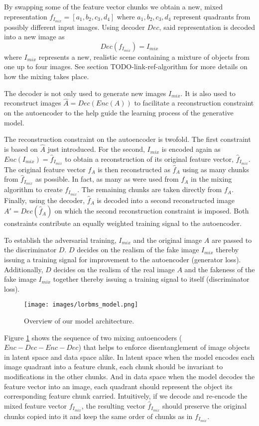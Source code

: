 \documentclass[12pt,a4paper]{article}
\begin{document}
By swapping some of the feature vector chunks we obtain a new, mixed representation $f_{I_{mix}} = [a_1, b_2, c_3, d_4]$ where $a_1,b_2,c_3,d_4$ represent quadrants from possibly different input images. Using decoder $Dec$, said representation is decoded into a new image as
\begin{equation} \label{eq:3}
    Dec(f_{I_{mix}}) = I_{mix}
\end{equation}
where $I_{mix}$ represents a new, realistic scene containing a mixture of objects from one up to four images. See section TODO-link-ref-algorithm for more details on how the mixing takes place.

The decoder is not only used to generate new images $I_{mix}$. It is also used to reconstruct images $\hat{A} = Dec(Enc(A))$ to facilitate a reconstruction constraint on the autoencoder to the help guide the learning process of the generative model.

The reconstruction constraint on the autoencoder is twofold. The first constraint is based on $\hat{A}$ just introduced. For the second, $I_{mix}$ is encoded again as $Enc(I_{mix}) = \hat{f}_{I_{mix}}$ to obtain a reconstruction of its original feature vector, $\hat{f}_{I_{mix}}$. The original feature vector $f_A$ is then reconstructed as $\hat{f}_A$ using as many chunks from $\hat{f}_{I_{mix}}$ as possible. In fact, as many as were used from $f_A$ in the mixing algorithm to create $f_{I_{mix}}$. The remaining chunks are taken directly from $f_A$. Finally, using the decoder, $\hat{f}_A$ is decoded into a second reconstructed image $A' = Dec(\hat{f}_A)$ on which the second reconstruction constraint is imposed. Both constraints contribute an equally weighted training signal to the autoencoder.

To establish the adversarial training, $I_{mix}$ and the original image $A$ are passed to the discriminator $D$. $D$ decides on the realism of the fake image $I_{mix}$ thereby issuing a training signal for improvement to the autoencoder (generator loss). Additionally, $D$ decides on the realism of the real image $A$ and the fakeness of the fake image $I_{mix}$ together thereby issuing a training signal to itself (discriminator loss).

\begin{figure}[h]
\centering
\texttt{[image: images/lorbms\_model.png]}
\caption{Overview of our model architecture.}
\label{fig:model_arch}
\end{figure}

Figure \ref{fig:model_arch} shows the sequence of two mixing autoencoders ($Enc-Dec-Enc-Dec$) that helps to enforce disentanglement of image objects in latent space and data space alike. In latent space when the model encodes each image quadrant into a feature chunk, each chunk should be invariant to modifications in the other chunks. And in data space when the model decodes the feature vector into an image, each quadrant should represent the object its corresponding feature chunk carried. Intuitively, if we decode and re-encode the mixed feature vector $f_{I_{mix}}$, the resulting vector $\hat{f}_{I_{mix}}$ should preserve the original chunks copied into it and keep the same order of chunks as in $f_{I_{mix}}$.
\end{document}

